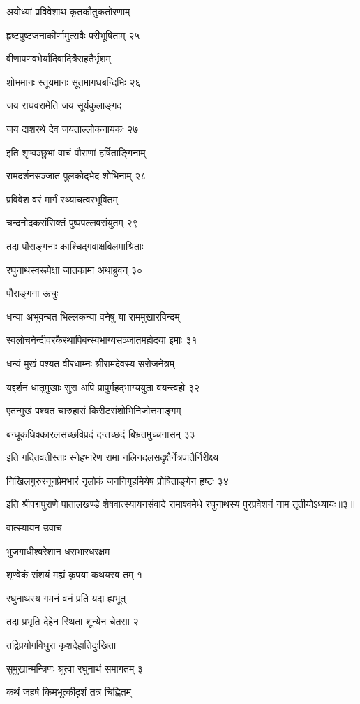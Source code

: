 अयोध्यां प्रविवेशाथ कृतकौतुकतोरणाम्

हृष्टपुष्टजनाकीर्णामुत्सवैः परीभूषिताम् २५

वीणापणवभेर्यादिवादित्रैराहतैर्भृशम्

शोभमानः स्तूयमानः सूतमागधबन्दिभिः २६

जय राघवरामेति जय सूर्यकुलाङ्गद

जय दाशरथे देव जयताल्लोकनायकः २७

इति शृण्वञ्छुभां वाचं पौराणां हर्षिताङ्गिनाम्

रामदर्शनसञ्जात पुलकोद्भेद शोभिनाम् २८

प्रविवेश वरं मार्गं रथ्याचत्वरभूषितम्

चन्दनोदकसंसिक्तं पुष्पपल्लवसंयुतम् २९

तदा पौराङ्गनाः काश्चिद्गवाक्षबिलमाश्रिताः

रघुनाथस्वरूपेक्षा जातकामा अथाब्रुवन् ३०

पौराङ्गना ऊचुः

धन्या अभूवन्बत भिल्लकन्या वनेषु या राममुखारविन्दम्

स्वलोचनेन्दीवरकैरथापिबन्स्वभाग्यसञ्जातमहोदया इमाः ३१

धन्यं मुखं पश्यत वीरधाम्नः श्रीरामदेवस्य सरोजनेत्रम्

यद्दर्शनं धातृमुखाः सुरा अपि प्रापुर्महद्भाग्ययुता वयन्त्वहो ३२

एतन्मुखं पश्यत चारुहासं किरीटसंशोभिनिजोत्तमाङ्गम्

बन्धूकधिक्कारलसच्छविप्रदं दन्तच्छदं बिभ्रतमुच्चनासम् ३३

इति गदितवतीस्ताः स्नेहभारेण रामा नलिनदलसदृक्षैर्नेत्रपातैर्निरीक्ष्य

निखिलगुरुरनूनप्रेमभारं नृलोकं जननिगृहमियेष प्रोषिताङ्गेन हृष्टः ३४

इति श्रीपद्मपुराणे पातालखण्डे शेषवात्स्यायनसंवादे रामाश्वमेधे रघुनाथस्य पुरप्रवेशनं नाम तृतीयोऽध्यायः॥३॥


वात्स्यायन उवाच

भुजगाधीश्वरेशान धराभारधरक्षम

शृण्वेकं संशयं मह्यं कृपया कथयस्व तम् १

रघुनाथस्य गमनं वनं प्रति यदा ह्यभूत्

तदा प्रभृति देहेन स्थिता शून्येन चेतसा २

तद्विप्रयोगविधुरा कृशदेहातिदुःखिता

सुमुखान्मन्त्रिणः श्रुत्वा रघुनाथं समागतम् ३

कथं जहर्ष किमभूत्कीदृशं तत्र चिह्नितम्

